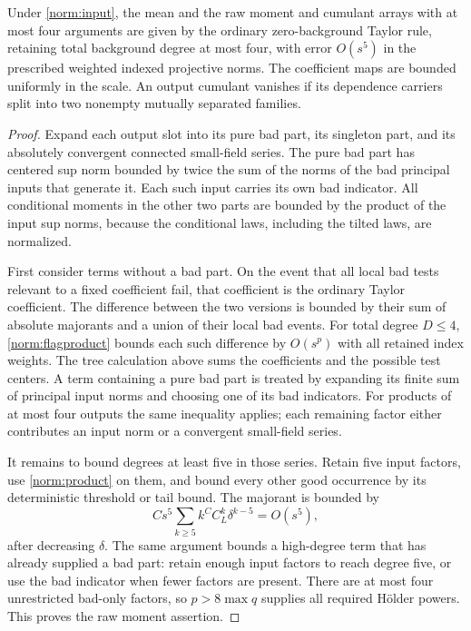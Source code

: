 \begin{proposition}\label{norm:taylor}
Under \eqref{norm:input}, the mean and the raw moment and cumulant arrays
with at most four arguments are given by the ordinary zero-background
Taylor rule, retaining total background degree at most four, with error
$O(s^5)$ in the prescribed weighted indexed projective norms.  The
coefficient maps are bounded uniformly in the scale.  An output cumulant
vanishes if its dependence carriers split into two nonempty mutually
separated families.
\end{proposition}
\begin{proof}
Expand each output slot into its pure bad part, its singleton part, and
its absolutely convergent connected small-field series.  The pure bad
part has centered sup norm bounded by twice the sum of the norms of the
bad principal inputs that generate it.  Each such input carries its own
bad indicator.  All conditional moments in the other two parts are
bounded by the product of the input sup norms, because the conditional
laws, including the tilted laws, are normalized.

First consider terms without a bad part.  On the event that all local
bad tests relevant to a fixed coefficient fail, that coefficient is the
ordinary Taylor coefficient.  The difference between the two versions
is bounded by their sum of absolute majorants and a union of their local
bad events.  For total degree $D\le4$, \eqref{norm:flagproduct} bounds
each such difference by $O(s^p)$ with all retained index weights.
The tree calculation above sums the coefficients and the possible test
centers.  A term containing a pure bad part is treated by expanding its
finite sum of principal input norms and choosing one of its bad
indicators.  For products of at most four outputs the same inequality
applies; each remaining factor either contributes an input norm or a
convergent small-field series.

It remains to bound degrees at least five in those series.  Retain five
input factors, use \eqref{norm:product} on them, and bound every other
good occurrence by its deterministic threshold or tail bound.  The
majorant is bounded by
\[
 C s^5\sum_{k\ge5} k^C C_L^k\delta^{k-5}=O(s^5),
\]
after decreasing $\delta$.  The same argument bounds a high-degree term
that has already supplied a bad part: retain enough input factors to
reach degree five, or use the bad indicator when fewer factors are
present.  There are at most four unrestricted bad-only factors, so
$p>8\max q$ supplies all required H\"older powers.  This proves the raw
moment assertion.


\end{proof}
